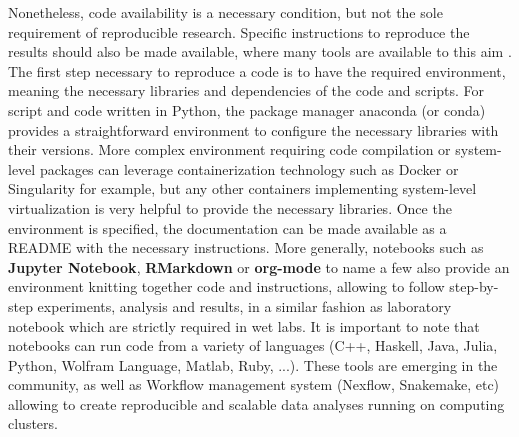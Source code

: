 Nonetheless, code availability is a necessary condition, but not the sole requirement of reproducible research.
Specific instructions to reproduce the results should also be made available, where many tools are available to this aim \citep{Wilson2014,Darriba2018}.
The first step necessary to reproduce a code is to have the required environment, meaning the necessary libraries and dependencies of the code and scripts.
For script and code written in Python, the package manager anaconda (or conda) provides a straightforward environment to configure the necessary libraries with their versions. 
More complex environment requiring code compilation or system-level packages can leverage containerization technology such as Docker or Singularity for example, but any other containers implementing system-level virtualization is very helpful to provide the necessary libraries.
Once the environment is specified, the documentation can be made available as a README with the necessary instructions.
More generally, notebooks such as \textbf{Jupyter Notebook}, \textbf{RMarkdown} or \textbf{org-mode} to name a few also provide an environment knitting together code and instructions, allowing to follow step-by-step experiments, analysis and results, in a similar fashion as laboratory notebook which are strictly required in wet labs.
It is important to note that notebooks can run code from a variety of languages (C++, Haskell, Java, Julia, Python, Wolfram Language, Matlab, Ruby, ...).
These tools are emerging in the community, as well as Workflow management system (Nexflow, Snakemake, etc) allowing to create reproducible and scalable data analyses running on computing clusters.

